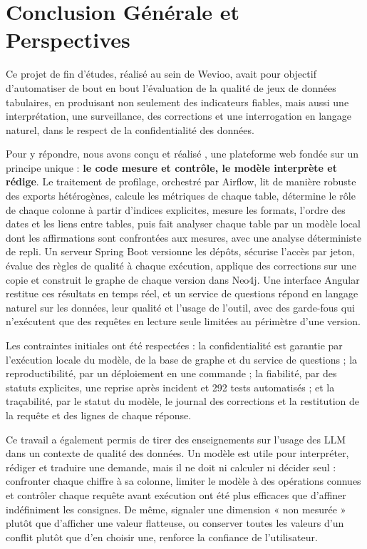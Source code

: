 \chapter*{Conclusion Générale et Perspectives}

Ce projet de fin d'études, réalisé au sein de Wevioo, avait pour objectif d'automatiser de bout en bout l'évaluation de la qualité de jeux de données tabulaires, en produisant non seulement des indicateurs fiables, mais aussi une interprétation, une surveillance, des corrections et une interrogation en langage naturel, dans le respect de la confidentialité des données.

Pour y répondre, nous avons conçu et réalisé \textbf{\projet}, une plateforme web fondée sur un principe unique : \textbf{le code mesure et contrôle, le modèle interprète et rédige}. Le traitement de profilage, orchestré par Airflow, lit de manière robuste des exports hétérogènes, calcule les métriques de chaque table, détermine le rôle de chaque colonne à partir d'indices explicites, mesure les formats, l'ordre des dates et les liens entre tables, puis fait analyser chaque table par un modèle local dont les affirmations sont confrontées aux mesures, avec une analyse déterministe de repli. Un serveur Spring Boot versionne les dépôts, sécurise l'accès par jeton, évalue des règles de qualité à chaque exécution, applique des corrections sur une copie et construit le graphe de chaque version dans Neo4j. Une interface Angular restitue ces résultats en temps réel, et un service de questions répond en langage naturel sur les données, leur qualité et l'usage de l'outil, avec des garde-fous qui n'exécutent que des requêtes en lecture seule limitées au périmètre d'une version.

Les contraintes initiales ont été respectées : la confidentialité est garantie par l'exécution locale du modèle, de la base de graphe et du service de questions ; la reproductibilité, par un déploiement en une commande ; la fiabilité, par des statuts explicites, une reprise après incident et 292 tests automatisés ; et la traçabilité, par le statut du modèle, le journal des corrections et la restitution de la requête et des lignes de chaque réponse.

Ce travail a également permis de tirer des enseignements sur l'usage des LLM dans un contexte de qualité des données. Un modèle est utile pour interpréter, rédiger et traduire une demande, mais il ne doit ni calculer ni décider seul : confronter chaque chiffre à sa colonne, limiter le modèle à des opérations connues et contrôler chaque requête avant exécution ont été plus efficaces que d'affiner indéfiniment les consignes. De même, signaler une dimension « non mesurée » plutôt que d'afficher une valeur flatteuse, ou conserver toutes les valeurs d'un conflit plutôt que d'en choisir une, renforce la confiance de l'utilisateur.

